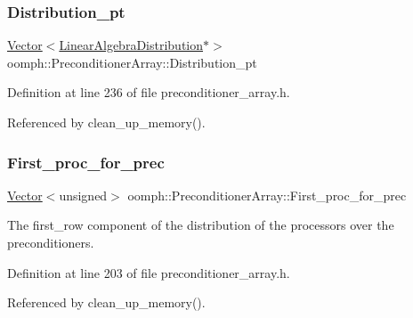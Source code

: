 \subsubsection{\texorpdfstring{Distribution\+\_\+pt}{Distribution\_pt}}
{\footnotesize\ttfamily \hyperlink{classoomph_1_1Vector}{Vector}$<$\hyperlink{classoomph_1_1LinearAlgebraDistribution}{Linear\+Algebra\+Distribution}$\ast$$>$ oomph\+::\+Preconditioner\+Array\+::\+Distribution\+\_\+pt\hspace{0.3cm}{\ttfamily [private]}}



Definition at line 236 of file preconditioner\+\_\+array.\+h.



Referenced by clean\+\_\+up\+\_\+memory().

\mbox{\label{classoomph_1_1PreconditionerArray_a44c35e1fafae4b68e28d95b7d76e73b5}} 
\subsubsection{\texorpdfstring{First\+\_\+proc\+\_\+for\+\_\+prec}{First\_proc\_for\_prec}}
{\footnotesize\ttfamily \hyperlink{classoomph_1_1Vector}{Vector}$<$unsigned$>$ oomph\+::\+Preconditioner\+Array\+::\+First\+\_\+proc\+\_\+for\+\_\+prec\hspace{0.3cm}{\ttfamily [private]}}



The first\+\_\+row component of the distribution of the processors over the preconditioners. 



Definition at line 203 of file preconditioner\+\_\+array.\+h.



Referenced by clean\+\_\+up\+\_\+memory().

\mbox{\label{classoomph_1_1PreconditionerArray_a64fe716df64c78b9d4c74212f5da314a}} 
